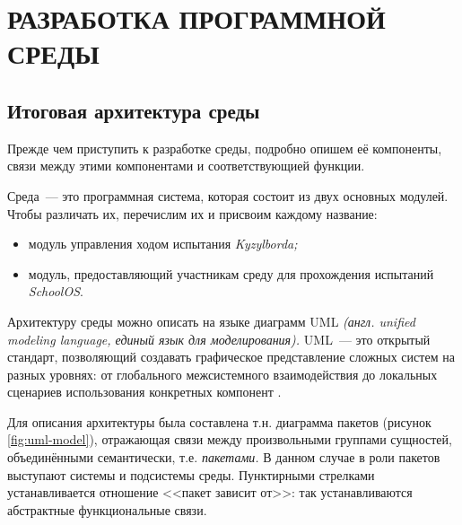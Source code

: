 \chapter{РАЗРАБОТКА ПРОГРАММНОЙ СРЕДЫ}



\section{Итоговая архитектура среды}

Прежде чем приступить к разработке среды, подробно опишем её компоненты, связи между этими компонентами и соответствующией функции.

Среда~--- это программная система, которая состоит из двух основных модулей. Чтобы различать их, перечислим их и присвоим каждому название:
\begin{itemize}
\item модуль управления ходом испытания \textit{Kyzylborda\footnotemark[1];}
\item модуль, предоставляющий участникам среду для прохождения испытаний \textit{SchoolOS}.
\end{itemize}


Архитектуру среды можно описать на языке диаграмм UML \textit{(англ. unified modeling language, единый язык для моделирования).} UML~--- это открытый стандарт, позволяющий создавать графическое представление сложных систем на разных уровнях: от глобального межсистемного взаимодействия до локальных сценариев использования конкретных компонент \cite{UML}.

Для описания архитектуры была составлена т.н. диаграмма пакетов (рисунок \ref{fig:uml-model}), отражающая связи между произвольными группами сущностей, объединёнными семантически, т.е. \textit{пакетами.} В данном случае в роли пакетов выступают системы и подсистемы среды. Пунктирными стрелками устанавливается отношение <<пакет зависит от>>: так устанавливаются абстрактные функциональные связи.


